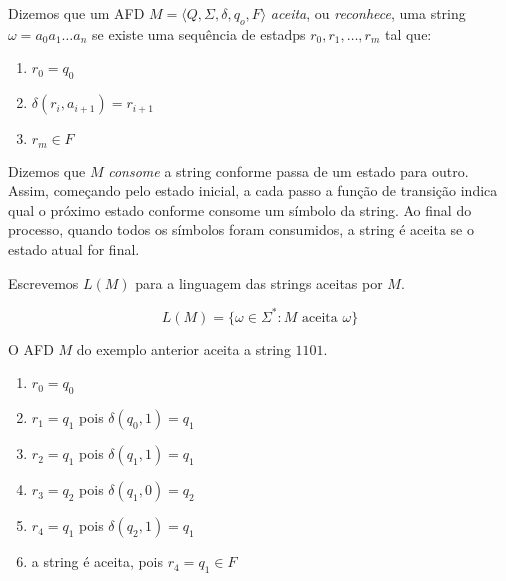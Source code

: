 Dizemos que um AFD $M = \langle Q, \Sigma, \delta, q_o, F \rangle$ {\em aceita}, ou {\em reconhece}, uma string $\omega = a_0 a_1 \dots a_n$ se existe uma sequência de estadps $r_0, r_1, \dots, r_m$ tal que:
\begin{enumerate}
\item $r_0 = q_0$
\item $\delta(r_i, a_{i+1}) = r_{i+1}$
\item $r_m \in F$
\end{enumerate}

Dizemos que $M$ {\em consome} a string conforme passa de um estado para outro.
Assim, começando pelo estado inicial, a cada passo a função de transição indica qual o próximo estado conforme consome um símbolo da string.
Ao final do processo, quando todos os símbolos foram consumidos, a string é aceita se o estado atual for final.

Escrevemos $L(M)$ para a linguagem das strings aceitas por $M$.

\begin{displaymath}
  L(M) = \{\omega \in \Sigma^* : M \textrm{ aceita } \omega\}
\end{displaymath}


\begin{example}
  O AFD $M$ do exemplo anterior aceita a string $1101$.
\begin{enumerate}
\item $r_0 = q_0$
\item $r_1 = q_1$ pois $\delta(q_0, 1) = q_1$
\item $r_2 = q_1$ pois $\delta(q_1, 1) = q_1$
\item $r_3 = q_2$ pois $\delta(q_1, 0) = q_2$
\item $r_4 = q_1$ pois $\delta(q_2, 1) = q_1$
\item a string é aceita, pois $r_4 = q_1 \in F$
\end{enumerate}
\end{example}


